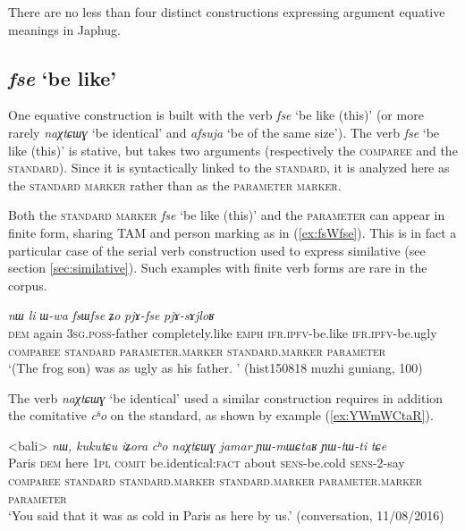 \documentclass[oneside,a4paper,12pt]{article}
\newcommand{\ipa}[1]{{\phon\textit{#1}}}
\newcommand{\forme}[2]{\ipa{#1} `#2'}
\begin{document}
There are no less than four distinct constructions expressing argument equative meanings in Japhug. 

\subsection{\forme{fse}{be like}} \label{sec:fse}
One equative construction is built with the verb \forme{fse}{be like (this)} (or more rarely \forme{naχtɕɯɣ}{be identical} and \forme{afsuja}{be of the same size}). The verb \forme{fse}{be like (this)} is stative, but takes two arguments (respectively the \textsc{comparee} and the \textsc{standard}). Since it is syntactically linked to the \textsc{standard}, it is analyzed here as the \textsc{standard marker} rather than as the \textsc{parameter marker}.

Both  the \textsc{standard marker} \forme{fse}{be like (this)} and the \textsc{parameter} can appear in finite form, sharing TAM and person marking as in (\ref{ex:fsWfse}). This is in fact a particular case of the serial verb construction used to express similative (see section \ref{sec:similative}). Such examples with finite verb forms are rare in the corpus.

\begin{exe}
\ex \label{ex:fsWfse}
\glll
\ipa{nɯ} 	\ipa{li} 	\ipa{ɯ-wa} 	\ipa{fsɯfse} 	\ipa{ʑo} 	\ipa{pjɤ-fse} 	\ipa{pjɤ-sɤjloʁ} \\
\textsc{dem} again \textsc{3sg.poss}-father completely.like \textsc{emph} \textsc{ifr.ipfv}-be.like \textsc{ifr.ipfv}-be.ugly \\
\textsc{comparee} { } \textsc{standard} \textsc{parameter.marker} { } \textsc{standard.marker} \textsc{parameter} \\
\glt `(The frog son) was as ugly as his father. ' (hist150818 muzhi guniang, 100)
\end{exe}

The verb \forme{naχtɕɯɣ}{be identical} used a similar construction requires in addition the comitative \ipa{cʰo} on the standard, as shown by example (\ref{ex:YWmWCtaR}).

\begin{exe}
\ex \label{ex:YWmWCtaR}
\glll 
<bali> 	\ipa{nɯ,} 	{\ipa{kukutɕu} \ipa{iʑora}} 	\ipa{cʰo} 	\ipa{naχtɕɯɣ} 	\ipa{jamar} 	\ipa{ɲɯ-mɯɕtaʁ} 	\ipa{ɲɯ-tɯ-ti} 	\ipa{tɕe} \\
Paris \textsc{dem} {here \textsc{1pl}} \textsc{comit} be.identical:\textsc{fact} about \textsc{sens}-be.cold \textsc{sens}-2-say \\
\textsc{comparee} { }  \textsc{standard} \textsc{standard.marker} \textsc{standard.marker}  \textsc{parameter.marker} \textsc{parameter} \\
\glt `You said that it was as cold in Paris as here by us.' (conversation, 11/08/2016)
\end{exe}
\end{document}
